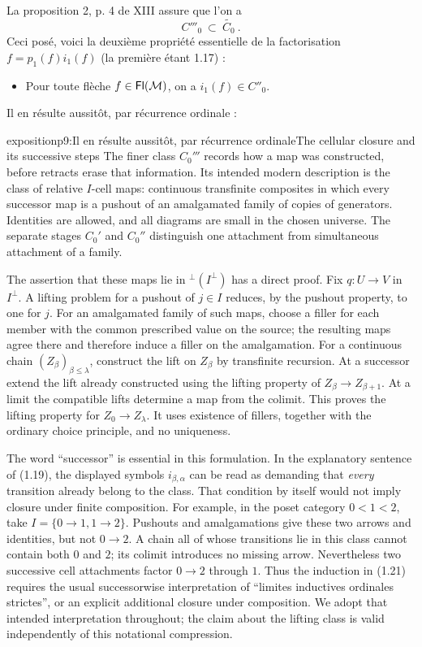 La proposition 2, p. 4 de XIII assure que l'on a
\[
C'''_0 \ \subset \ \widetilde{C_0} \ .
\]
Ceci posé, voici la deuxième propriété essentielle de la factorisation $f = p_1(f)i_1(f)$ (la première étant 1.17) :

\begin{itemize}[leftmargin=5em, labelwidth=4em, labelsep=1em, align=left]
\item[(1.20)] \qquad\qquad Pour toute flèche $f \in \mathsf{Fl}(\mathcal{M})$, on a $i_1(f) \in C''_0$.
\end{itemize}

Il en résulte aussitôt, par récurrence ordinale :

\begin{dcomment}{exposition}{p9:Il en résulte aussitôt, par récurrence ordinale}{The cellular closure and its successive steps}
The finer class $C_0'''$ records how a map was constructed, before retracts erase that information. Its intended modern description is the class of relative $I$-cell maps: continuous transfinite composites in which every successor map is a pushout of an amalgamated family of copies of generators. Identities are allowed, and all diagrams are small in the chosen universe. The separate stages $C_0'$ and $C_0''$ distinguish one attachment from simultaneous attachment of a family.

The assertion that these maps lie in ${}^{\perp}(I^\perp)$ has a direct proof. Fix $q:U\to V$ in $I^\perp$. A lifting problem for a pushout of $j\in I$ reduces, by the pushout property, to one for $j$. For an amalgamated family of such maps, choose a filler for each member with the common prescribed value on the source; the resulting maps agree there and therefore induce a filler on the amalgamation. For a continuous chain $(Z_\beta)_{\beta\leq\lambda}$, construct the lift on $Z_\beta$ by transfinite recursion. At a successor extend the lift already constructed using the lifting property of $Z_\beta\to Z_{\beta+1}$. At a limit the compatible lifts determine a map from the colimit. This proves the lifting property for $Z_0\to Z_\lambda$. It uses existence of fillers, together with the ordinary choice principle, and no uniqueness.

The word ``successor'' is essential in this formulation. In the explanatory sentence of (1.19), the displayed symbols $i_{\beta,\alpha}$ can be read as demanding that \emph{every} transition already belong to the class. That condition by itself would not imply closure under finite composition. For example, in the poset category $0<1<2$, take $I=\{0\to1,1\to2\}$. Pushouts and amalgamations give these two arrows and identities, but not $0\to2$. A chain all of whose transitions lie in this class cannot contain both $0$ and $2$; its colimit introduces no missing arrow. Nevertheless two successive cell attachments factor $0\to2$ through $1$. Thus the induction in (1.21) requires the usual successorwise interpretation of ``limites inductives ordinales strictes'', or an explicit additional closure under composition. We adopt that intended interpretation throughout; the claim about the lifting class is valid independently of this notational compression.
\end{dcomment}


